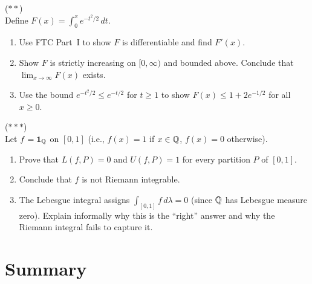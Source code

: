 \documentclass[11pt,a4paper]{article}
\begin{document}
\begin{exercise}
\textnormal{(\(**\))} \\
Define $F(x) = \int_0^x e^{-t^2/2}\,dt$.
\begin{enumerate}[nosep,label=(\alph*)]
  \item Use FTC Part~I to show $F$ is differentiable and find $F'(x)$.
  \item Show $F$ is strictly increasing on $[0, \infty)$ and bounded
    above. Conclude that $\lim_{x \to \infty} F(x)$ exists.
  \item Use the bound $e^{-t^2/2} \le e^{-t/2}$ for $t \ge 1$ to show
    $F(x) \le 1 + 2e^{-1/2}$ for all $x \ge 0$.
\end{enumerate}
\end{exercise}

\begin{exercise}
\textnormal{(\(***\))} \\
Let $f = \mathbf{1}_{\mathbb{Q}}$ on $[0,1]$ (i.e., $f(x) = 1$ if $x \in \mathbb{Q}$,
$f(x) = 0$ otherwise).
\begin{enumerate}[nosep,label=(\alph*)]
  \item Prove that $L(f, P) = 0$ and $U(f, P) = 1$ for every partition
    $P$ of $[0,1]$.
  \item Conclude that $f$ is not Riemann integrable.
  \item The Lebesgue integral assigns $\int_{[0,1]} f\,d\lambda = 0$
    (since $\mathbb{Q}$ has Lebesgue measure zero). Explain informally why this
    is the ``right'' answer and why the Riemann integral fails to
    capture it.
\end{enumerate}
\end{exercise}

\section{Summary}
\label{sec:summary}
\end{document}
